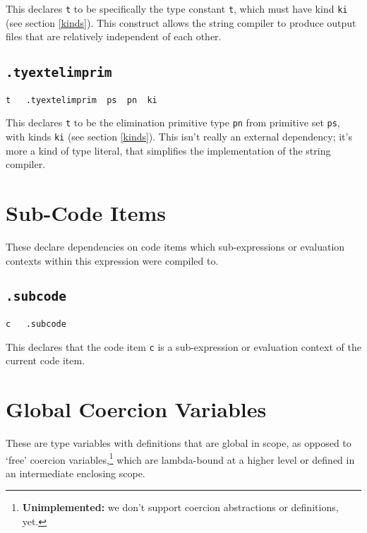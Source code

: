 \documentclass{report}
\newcommand\stringcode[1]{\texttt{#1}}
\newcommand\unimpl[1]{\footnote{\textbf{Unimplemented: }#1}}
\begin{document}
This declares \stringcode{t} to be specifically the type constant \stringcode{t},
which must have kind \stringcode{ki} (see section \ref{kinds}).
This construct allows the string compiler to produce output files that are relatively independent of each other.

\subsection{\stringcode{.tyextelimprim}}

\begin{verbatim}
t	.tyextelimprim	ps	pn	ki
\end{verbatim}

This declares \stringcode{t} to be the elimination primitive type \stringcode{pn} from primitive set \stringcode{ps},
with kinds \stringcode{ki} (see section \ref{kinds}).
This isn't really an external dependency;
it's more a kind of type literal, that simplifies the implementation of the string compiler.

\section{Sub-Code Items}
\label{subcode}

These declare dependencies on code items which sub-expressions or evaluation contexts within this expression were compiled to.

\subsection{\stringcode{.subcode}}

\begin{verbatim}
c	.subcode
\end{verbatim}

This declares that the code item \stringcode{c} is a sub-expression or evaluation context of the current code item.

\section{Global Coercion Variables}
\label{coercion_gvar}

These are type variables with definitions that are global in scope,
as opposed to `free' coercion variables,\unimpl{we don't support coercion abstractions or definitions, yet.}
which are lambda-bound at a higher level or defined in an intermediate enclosing scope.
\end{document}
